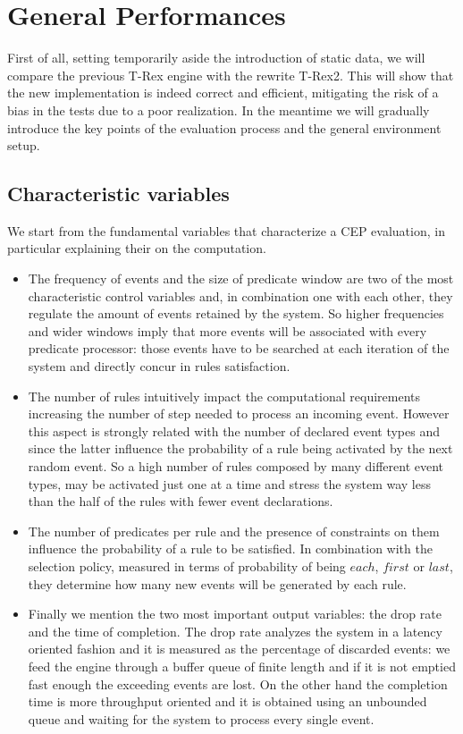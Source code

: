 \section{General Performances}
First of all, setting temporarily aside the introduction of static data, we will compare the previous T-Rex engine with the rewrite T-Rex2. This will show that the new implementation is indeed correct and efficient, mitigating the risk of a bias in the tests due to a poor realization. In the meantime we will gradually introduce the key points of the evaluation process and the general environment setup.

\subsection{Characteristic variables}
We start from the fundamental variables that characterize a CEP evaluation, in particular explaining their on the computation.
\begin{itemize}
\item The frequency of events and the size of predicate window are two of the most characteristic control variables and, in combination one with each other, they regulate the amount of events retained by the system. So higher frequencies and wider windows imply that more events will be associated with every predicate processor: those events have to be searched at each iteration of the system and directly concur in rules satisfaction.
\item The number of rules intuitively impact the computational requirements increasing the number of step needed to process an incoming event. However this aspect is strongly related with the number of declared event types and since the latter influence the probability of a rule being activated by the next random event. So a high number of rules composed by many different event types, may be activated just one at a time and stress the system way less than the half of the rules with fewer event declarations.
\item The number of predicates per rule and the presence of constraints on them influence the probability of a rule to be satisfied. In combination with the selection policy, measured in terms of probability of being $each$, $first$ or $last$, they determine how many new events will be generated by each rule.
\item Finally we mention the two most important output variables: the drop rate and the time of completion. The drop rate analyzes the system in a latency oriented fashion and it is measured as the percentage of discarded events: we feed the engine through a buffer queue of finite length and if it is not emptied fast enough the exceeding events are lost. On the other hand the completion time is more throughput oriented and it is obtained using an unbounded queue and waiting for the system to process every single event.
\end{itemize}

